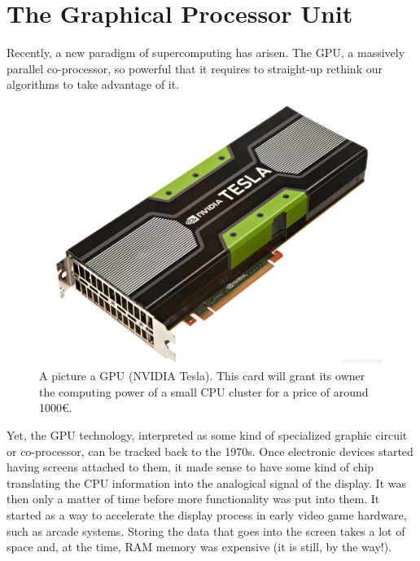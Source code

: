 \documentclass[ twoside,openright,titlepage,numbers=noenddot,%
headinclude,footinclude,cleardoublepage=empty,abstract=on,
BCOR=5mm,paper=b5,fontsize=11pt, dvipsnames
]{scrreprt}
\newcommand{\gpu}{\gls{GPU}\xspace}
\begin{document}
\section{The Graphical Processor Unit}

Recently, a new paradigm of supercomputing has arisen. The \gpu, a massively parallel co-processor, so powerful that it requires to straight-up rethink our algorithms to take advantage of it.

\begin{figure}
  \centering
  \includegraphics[width=\textwidth]{gpu_and_me}
  \caption{A picture a GPU (NVIDIA Tesla). This card will grant its owner the computing power of a small CPU cluster for a price of around 1000€.}
  \label{fig:gpuandme}
\end{figure}

Yet, the \gpu technology, interpreted as some kind of specialized graphic circuit or co-processor, can be tracked back to the 1970s. Once electronic devices started having screens attached to them, it made sense to have some kind of chip translating the CPU information into the analogical signal of the display. It was then only a matter of time before more functionality was put into them. It started as a way to accelerate the display process in early video game hardware, such as arcade systems.
Storing the data that goes into the screen takes a lot of space and, at the time, RAM memory was expensive (it is still, by the way!).
\end{document}
